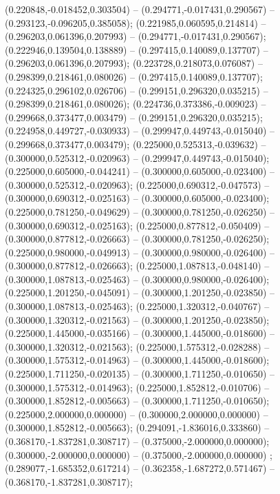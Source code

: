 (0.220848,-0.018452,0.303504) -- (0.294771,-0.017431,0.290567) -- (0.293123,-0.096205,0.385058);
 (0.221985,0.060595,0.214814) -- (0.296203,0.061396,0.207993) -- (0.294771,-0.017431,0.290567);
 (0.222946,0.139504,0.138889) -- (0.297415,0.140089,0.137707) -- (0.296203,0.061396,0.207993);
 (0.223728,0.218073,0.076087) -- (0.298399,0.218461,0.080026) -- (0.297415,0.140089,0.137707);
 (0.224325,0.296102,0.026706) -- (0.299151,0.296320,0.035215) -- (0.298399,0.218461,0.080026);
 (0.224736,0.373386,-0.009023) -- (0.299668,0.373477,0.003479) -- (0.299151,0.296320,0.035215);
 (0.224958,0.449727,-0.030933) -- (0.299947,0.449743,-0.015040) -- (0.299668,0.373477,0.003479);
 (0.225000,0.525313,-0.039632) -- (0.300000,0.525312,-0.020963) -- (0.299947,0.449743,-0.015040);
 (0.225000,0.605000,-0.044241) -- (0.300000,0.605000,-0.023400) -- (0.300000,0.525312,-0.020963);
 (0.225000,0.690312,-0.047573) -- (0.300000,0.690312,-0.025163) -- (0.300000,0.605000,-0.023400);
 (0.225000,0.781250,-0.049629) -- (0.300000,0.781250,-0.026250) -- (0.300000,0.690312,-0.025163);
 (0.225000,0.877812,-0.050409) -- (0.300000,0.877812,-0.026663) -- (0.300000,0.781250,-0.026250);
 (0.225000,0.980000,-0.049913) -- (0.300000,0.980000,-0.026400) -- (0.300000,0.877812,-0.026663);
 (0.225000,1.087813,-0.048140) -- (0.300000,1.087813,-0.025463) -- (0.300000,0.980000,-0.026400);
 (0.225000,1.201250,-0.045091) -- (0.300000,1.201250,-0.023850) -- (0.300000,1.087813,-0.025463);
 (0.225000,1.320312,-0.040767) -- (0.300000,1.320312,-0.021563) -- (0.300000,1.201250,-0.023850);
 (0.225000,1.445000,-0.035166) -- (0.300000,1.445000,-0.018600) -- (0.300000,1.320312,-0.021563);
 (0.225000,1.575312,-0.028288) -- (0.300000,1.575312,-0.014963) -- (0.300000,1.445000,-0.018600);
 (0.225000,1.711250,-0.020135) -- (0.300000,1.711250,-0.010650) -- (0.300000,1.575312,-0.014963);
 (0.225000,1.852812,-0.010706) -- (0.300000,1.852812,-0.005663) -- (0.300000,1.711250,-0.010650);
 (0.225000,2.000000,0.000000) -- (0.300000,2.000000,0.000000) -- (0.300000,1.852812,-0.005663);
 (0.294091,-1.836016,0.333860) -- (0.368170,-1.837281,0.308717) -- (0.375000,-2.000000,0.000000);
 (0.300000,-2.000000,0.000000) -- (0.375000,-2.000000,0.000000) ;
 (0.289077,-1.685352,0.617214) -- (0.362358,-1.687272,0.571467) -- (0.368170,-1.837281,0.308717);
